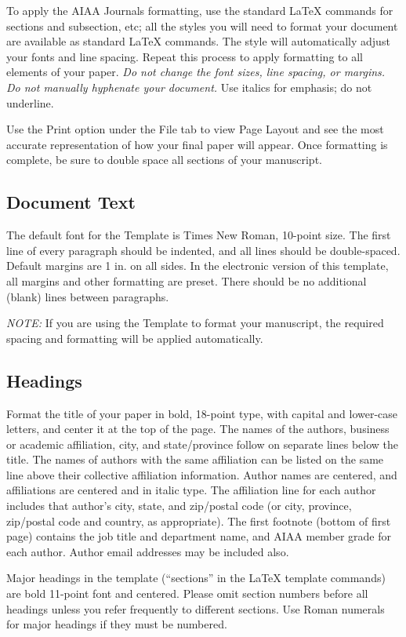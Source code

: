 \documentclass[journal ]{new-aiaa}
\begin{document}
To apply the AIAA Journals formatting, use the standard \LaTeX{} commands for sections and subsection, etc; all the styles you will need to format your document are available as standard \LaTeX{} commands. The style will automatically adjust your fonts and line spacing. Repeat this process to apply formatting to all elements of your paper. \emph{Do not change the font sizes, line spacing, or margins. Do not manually hyphenate your document.} Use italics for emphasis; do not underline. 

Use the Print option under the File tab to view Page Layout and see the most accurate representation of how your final paper will appear. Once formatting is complete, be sure to double space all sections of your manuscript.


\subsection{Document Text}
The default font for the Template is Times New Roman, 10-point size. The first line of every paragraph should be indented, and all lines should be double-spaced. Default margins are 1 in. on all sides. In the electronic version of this template, all margins and other formatting are preset. There should be no additional (blank) lines between paragraphs.

\emph{NOTE:} If you are using the Template to format your manuscript, the required spacing and formatting will be applied automatically.


\subsection{Headings}
Format the title of your paper in bold, 18-point type, with capital and lower-case letters, and center it at the top of the page. The names of the authors, business or academic affiliation, city, and state/province follow on separate lines below the title. The names of authors with the same affiliation can be listed on the same line above their collective affiliation information. Author names are centered, and affiliations are centered and in italic type. The affiliation line for each author includes that author’s city, state, and zip/postal code (or city, province, zip/postal code and country, as appropriate). The first footnote (bottom of first page) contains the job title and department name, and AIAA member grade for each author. Author email addresses may be included also.

Major headings in the template (``sections'' in the \LaTeX{} template commands) are bold 11-point font and centered. Please omit section numbers before all headings unless you refer frequently to different sections. Use Roman numerals for major headings if they must be numbered.
\end{document}
